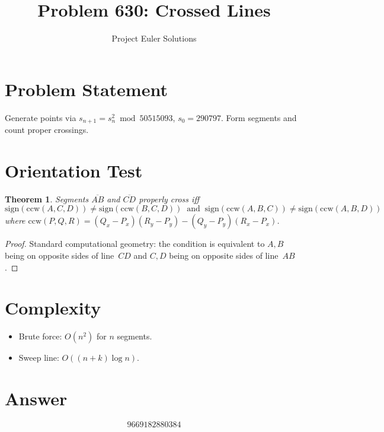 \documentclass[11pt]{article}
\title{Problem 630: Crossed Lines}
\author{Project Euler Solutions}
\date{}
\newtheorem{theorem}{Theorem}
\begin{document}
\maketitle

\section{Problem Statement}
Generate points via $s_{n+1} = s_n^2 \bmod 50515093$, $s_0 = 290797$. Form segments and count proper crossings.

\section{Orientation Test}
\begin{theorem}
Segments $\overline{AB}$ and $\overline{CD}$ properly cross iff
\[
\mathrm{sign}(\mathrm{ccw}(A,C,D)) \ne \mathrm{sign}(\mathrm{ccw}(B,C,D)) \;\;\text{and}\;\; \mathrm{sign}(\mathrm{ccw}(A,B,C)) \ne \mathrm{sign}(\mathrm{ccw}(A,B,D))
\]
where $\mathrm{ccw}(P,Q,R) = (Q_x-P_x)(R_y-P_y) - (Q_y-P_y)(R_x-P_x)$.
\end{theorem}

\begin{proof}
Standard computational geometry: the condition is equivalent to $A,B$ being on opposite sides of line~$CD$ and $C,D$ being on opposite sides of line~$AB$.
\end{proof}

\section{Complexity}
\begin{itemize}
\item Brute force: $O(n^2)$ for $n$ segments.
\item Sweep line: $O((n+k)\log n)$.
\end{itemize}

\section{Answer}

\[
\boxed{9669182880384}
\]
\end{document}
